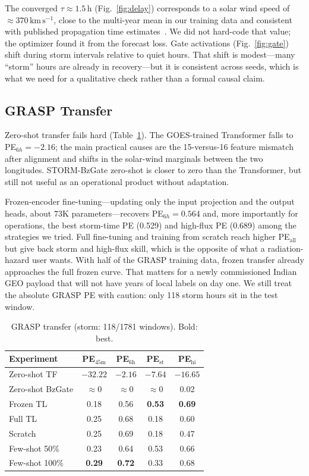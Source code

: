 \documentclass[conference]{IEEEtran}
\begin{document}
The converged \(\tau\approx1.5\,\mathrm{h}\) (Fig.~\ref{fig:delay}) corresponds
to a solar wind speed of \(\approx370\,\mathrm{km\,s^{-1}}\), close to the
multi-year mean in our training data and consistent with published propagation
time estimates~\cite{forsyth2020}. We did not hard-code that value; the
optimizer found it from the forecast loss. Gate activations
(Fig.~\ref{fig:gate}) shift during storm intervals relative to quiet hours.
That shift is modest---many ``storm'' hours are already in recovery---but it
is consistent across seeds, which is what we need for a qualitative check
rather than a formal causal claim.

\subsection{GRASP Transfer}
Zero-shot transfer fails hard (Table~\ref{tab:grasp}). The GOES-trained
Transformer falls to PE\(_{6h}=-2.16\); the main practical causes are the
15-versus-16 feature mismatch after alignment and shifts in the solar-wind
marginals between the two longitudes. STORM-BzGate zero-shot is closer to
zero than the Transformer, but still not useful as an operational product
without adaptation.

Frozen-encoder fine-tuning---updating only the input projection and the output
heads, about \(73\)K parameters---recovers PE\(_{6h}=0.564\) and, more
importantly for operations, the best storm-time PE (0.529) and high-flux PE
(0.689) among the strategies we tried. Full fine-tuning and training from
scratch reach higher PE\(_\mathrm{all}\) but give back storm and high-flux
skill, which is the opposite of what a radiation-hazard user wants. With half
of the GRASP training data, frozen transfer already approaches the full
frozen curve. That matters for a newly commissioned Indian GEO payload that
will not have years of local labels on day one. We still treat the absolute
GRASP PE with caution: only 118 storm hours sit in the test window.

\begin{table}[t]
\centering
\caption{GRASP transfer (storm: 118/1781 windows). Bold: best.}
\label{tab:grasp}
\setlength{\tabcolsep}{3.2pt}
\begin{tabular}{lcccc}
\toprule
Experiment & PE\(_{45\mathrm{m}}\) & PE\(_{6\mathrm{h}}\) & PE\(_{\mathrm{st}}\) & PE\(_{\mathrm{hi}}\) \\
\midrule
Zero-shot TF & \(-32.22\) & \(-2.16\) & \(-7.64\) & \(-16.65\) \\
Zero-shot BzGate & \(\approx0\) & \(\approx0\) & \(\approx0\) & 0.02 \\
Frozen TL & 0.18 & 0.56 & \textbf{0.53} & \textbf{0.69} \\
Full TL & 0.25 & 0.68 & 0.18 & 0.60 \\
Scratch & 0.25 & 0.69 & 0.18 & 0.47 \\
Few-shot 50\% & 0.23 & 0.64 & 0.53 & 0.66 \\
Few-shot 100\% & \textbf{0.29} & \textbf{0.72} & 0.33 & 0.68 \\
\bottomrule
\end{tabular}
\end{table}
\end{document}
